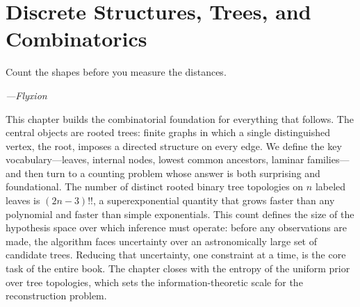 \chapter{Discrete Structures, Trees, and Combinatorics}
\label{ch:discrete}

\epigraph{%
  Count the shapes before you measure the distances.%
}{\textit{---Flyxion}}

This chapter builds the combinatorial foundation for everything that follows. The central objects are rooted trees: finite graphs in which a single distinguished vertex, the root, imposes a directed structure on every edge. We define the key vocabulary---leaves, internal nodes, lowest common ancestors, laminar families---and then turn to a counting problem whose answer is both surprising and foundational. The number of distinct rooted binary tree topologies on $n$ labeled leaves is $(2n-3)!!$, a superexponential quantity that grows faster than any polynomial and faster than simple exponentials. This count defines the size of the hypothesis space over which inference must operate: before any observations are made, the algorithm faces uncertainty over an astronomically large set of candidate trees. Reducing that uncertainty, one constraint at a time, is the core task of the entire book. The chapter closes with the entropy of the uniform prior over tree topologies, which sets the information-theoretic scale for the reconstruction problem.

